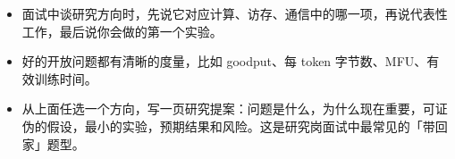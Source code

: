 \begin{keypts}
\begin{itemize}
\item 面试中谈研究方向时，先说它对应计算、访存、通信中的哪一项，再说代表性工作，最后说你会做的第一个实验。
\item 好的开放问题都有清晰的度量，比如 goodput、每 token 字节数、MFU、有效训练时间。
\end{itemize}
\end{keypts}

\begin{research}
\begin{itemize}
\item 从上面任选一个方向，写一页研究提案：问题是什么，为什么现在重要，可证伪的假设，最小的实验，预期结果和风险。这是研究岗面试中最常见的「带回家」题型。
\end{itemize}
\end{research}
